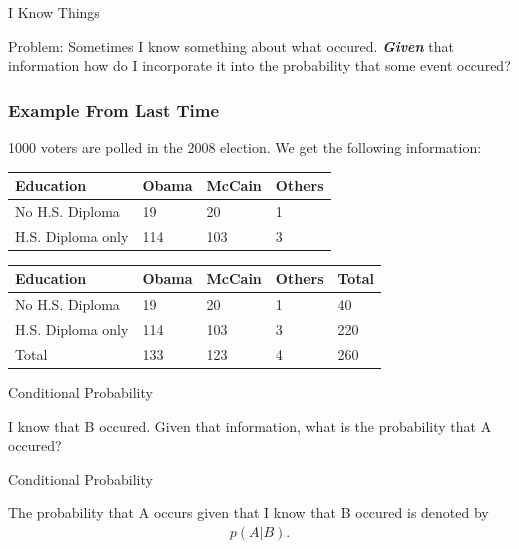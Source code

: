 \begin{frame}{I Know Things}

  Problem: Sometimes I know something about what
  occured. \textit{\textbf{Given}} that information how do I incorporate it
  into the probability that some event occured?
  
\end{frame}

\begin{frame}
  \frametitle{Example From Last Time}

  1000 voters are polled in the 2008 election. We get the following
  information: \\
  {
    \begin{tabular}{l|l|l|l}
      Education & Obama & McCain & Others  \\ \hline
      No H.S. Diploma & 19 & 20 & 1   \\
      H.S. Diploma only & 114 & 103 & 3 
    \end{tabular}
  }
  {
    \begin{tabular}{l|l|l|l|l}
      Education & Obama & McCain & Others & Total \\ \hline
      No H.S. Diploma & 19 & 20 & 1 & 40 \\
      H.S. Diploma only & 114 & 103 & 3 & 220 \\ \hline
      Total & 133 & 123 & 4 & 260
    \end{tabular}
  }



\end{frame}



\begin{frame}{Conditional Probability}

  I know that B occured. Given that information, what is the
  probability that A occured?

  \begin{definition}{Conditional Probability}

    The probability that A occurs given that I know that B occured is
    denoted by
    \begin{eqnarray*}
      p(A|B).
    \end{eqnarray*}
    
  \end{definition}
  
\end{frame}




